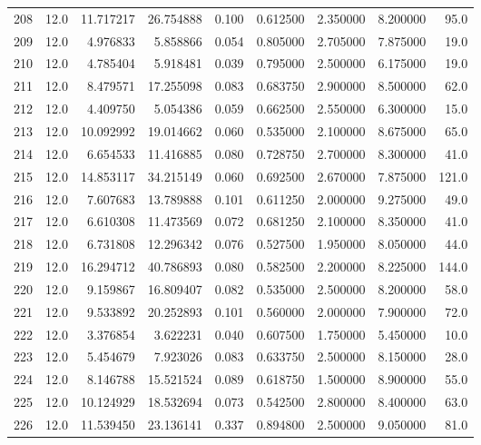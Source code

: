 \begin{tabular}{lrrrrrrrr}
208  &   12.0 &  11.717217 &  26.754888 &  0.100 &  0.612500 &  2.350000 &   8.200000 &   95.0 \\
209  &   12.0 &   4.976833 &   5.858866 &  0.054 &  0.805000 &  2.705000 &   7.875000 &   19.0 \\
210  &   12.0 &   4.785404 &   5.918481 &  0.039 &  0.795000 &  2.500000 &   6.175000 &   19.0 \\
211  &   12.0 &   8.479571 &  17.255098 &  0.083 &  0.683750 &  2.900000 &   8.500000 &   62.0 \\
212  &   12.0 &   4.409750 &   5.054386 &  0.059 &  0.662500 &  2.550000 &   6.300000 &   15.0 \\
213  &   12.0 &  10.092992 &  19.014662 &  0.060 &  0.535000 &  2.100000 &   8.675000 &   65.0 \\
214  &   12.0 &   6.654533 &  11.416885 &  0.080 &  0.728750 &  2.700000 &   8.300000 &   41.0 \\
215  &   12.0 &  14.853117 &  34.215149 &  0.060 &  0.692500 &  2.670000 &   7.875000 &  121.0 \\
216  &   12.0 &   7.607683 &  13.789888 &  0.101 &  0.611250 &  2.000000 &   9.275000 &   49.0 \\
217  &   12.0 &   6.610308 &  11.473569 &  0.072 &  0.681250 &  2.100000 &   8.350000 &   41.0 \\
218  &   12.0 &   6.731808 &  12.296342 &  0.076 &  0.527500 &  1.950000 &   8.050000 &   44.0 \\
219  &   12.0 &  16.294712 &  40.786893 &  0.080 &  0.582500 &  2.200000 &   8.225000 &  144.0 \\
220  &   12.0 &   9.159867 &  16.809407 &  0.082 &  0.535000 &  2.500000 &   8.200000 &   58.0 \\
221  &   12.0 &   9.533892 &  20.252893 &  0.101 &  0.560000 &  2.000000 &   7.900000 &   72.0 \\
222  &   12.0 &   3.376854 &   3.622231 &  0.040 &  0.607500 &  1.750000 &   5.450000 &   10.0 \\
223  &   12.0 &   5.454679 &   7.923026 &  0.083 &  0.633750 &  2.500000 &   8.150000 &   28.0 \\
224  &   12.0 &   8.146788 &  15.521524 &  0.089 &  0.618750 &  1.500000 &   8.900000 &   55.0 \\
225  &   12.0 &  10.124929 &  18.532694 &  0.073 &  0.542500 &  2.800000 &   8.400000 &   63.0 \\
226  &   12.0 &  11.539450 &  23.136141 &  0.337 &  0.894800 &  2.500000 &   9.050000 &   81.0 \\

\end{tabular}
